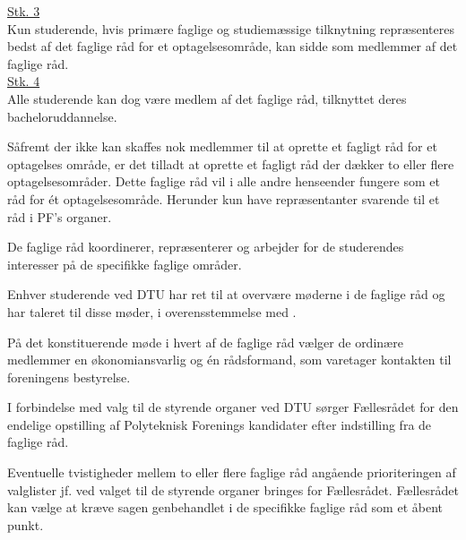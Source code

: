 \begin{list}
\underline{Stk. 3} \\
Kun studerende, hvis primære faglige og studiemæssige tilknytning repræsenteres bedst af det faglige råd for et optagelsesområde, kan sidde som medlemmer af det faglige råd.\\

\underline{Stk. 4} \\ 
Alle studerende kan dog være medlem af det faglige råd, tilknyttet deres bacheloruddannelse.\\

\item Såfremt der ikke kan skaffes nok medlemmer til at oprette et fagligt råd for et optagelses område, er det tilladt at oprette et fagligt råd der dækker to eller flere optagelsesområder. Dette faglige råd vil i alle andre henseender fungere som et råd for ét optagelsesområde. Herunder kun have repræsentanter svarende til et råd i PF’s organer.\\

\item De faglige råd koordinerer, repræsenterer og arbejder for de studerendes interesser på de specifikke faglige områder.\\

\item Enhver studerende ved DTU har ret til at overvære møderne i de faglige råd og har taleret til disse møder, i overensstemmelse med .\\

\item På det konstituerende møde i hvert af de faglige råd vælger de ordinære medlemmer en økonomiansvarlig og én rådsformand, som varetager kontakten til foreningens bestyrelse.\\

\item \label{L:faglige:DTUvalg} I forbindelse med valg til de styrende organer ved DTU sørger Fællesrådet for den endelige opstilling af Polyteknisk Forenings kandidater efter indstilling fra de faglige råd.\\

\item Eventuelle tvistigheder mellem to eller flere faglige råd angående prioriteringen af valglister jf.  ved valget til de styrende organer bringes for Fællesrådet. Fællesrådet kan vælge at kræve sagen genbehandlet i de specifikke faglige råd som et åbent punkt.\\


\end{list}

